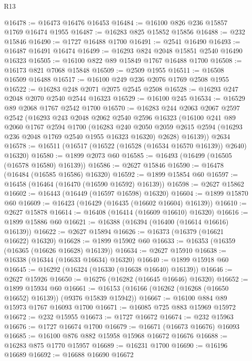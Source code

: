 \begin{lexlean}{R13}
\begin{coremodule}
@16478 := @16473 @16476 @16453
@16484 := @16100 @826 @236 @15857 @1769 @16474 @1955
@16487 := @16283 @825 @15852 @15856
@16488 := @232 @15846
@16490 := @1727 @16488 @1700
@16491 := @2541 @16490
@16493 := @16487 @16491 @16474
@16499 := @16293 @824 @2048 @15851 @2540 @16490 @16323
@16505 := @16100 @822 @89 @15849 @1767 @16488 @1700
@16508 := @16173 @821 @7068 @15848
@16509 := @2509 @1955
@16511 := @16508 @16509 @16488
@16517 := @16100 @249 @236 @2076 @1769 @2508 @1955
@16522 := @16283 @248 @2071 @2075 @2545 @2508
@16528 := @16293 @247 @2048 @2070 @2540 @2544 @16323
@16529 := @16100 @245
@16534 := @16529 @89 @2068 @1767 @2542 @1700
@16570 := @16283
    @244
    @2063
    @2067
    @2597
    @2542
    (@16293
      @243
      @2048
      @2062
      @2540
      @2596
      @16323
      (@16100
        @241
        @89
        @2060
        @1767
        @2594
        @1700
        (@16283
          @240
          @2050
          @2059
          @2615
          @2594
          (@16293 @236 @2048 @1769 @2540 @1955 @16323 @16320)
          @2628)
        @16139))
    @2634
@16578 := @16511 (@16517 (@16522 (@16528 (@16534 @16570 @16139)) @2640) @16320)
@16580 := @1899 @2073 @60
@16585 := @16493 (@16499 (@16505 (@16578 @16580) @16139))
@16586 := @2627 @15846
@16590 := @16478 (@16484 (@16585 @16586) @16320)
@16592 := @1899 @15854 @60
@16597 := @16458 (@16464 (@16470 (@16590 @16592) @16139))
@16598 := @2627 @15862
@16602 := @16443 (@16449 (@16597 @16598) @16320)
@16604 := @1899 @15870 @60
@16609 := @16423 (@16429 (@16435 (@16602 @16604) @16139))
@16610 := @2627 @15878
@16614 := @16408 (@16414 (@16609 @16610) @16320)
@16616 := @1899 @15886 @60
@16621 := @16388 (@16394 (@16400 (@16614 @16616) @16139))
@16622 := @2627 @15894
@16626 := @16373 (@16379 (@16621 @16622) @16320)
@16628 := @1899 @15902 @60
@16633 := @16353 (@16359 (@16365 (@16626 @16628) @16139))
@16634 := @2627 @15910
@16638 := @16338 (@16344 (@16633 @16634) @16320)
@16640 := @1899 @15918 @60
@16645 := @16292 (@16324 (@16330 (@16638 @16640) @16139))
@16646 := @2627 @15926
@16650 := @16276 (@16282 (@16645 @16646) @16320)
@16652 := @1899 @15934 @60
@16661 := @16153 (@16166 (@16262 (@16268 (@16650 @16652) @16139)) (@9376 @15839 @15942))
@16667 := @16100 @884 @89 @15973 @1767 @16093 @1700
@16671 := @16085 @725 @883 @15969 @15972
@16672 := @232 @15955
@16673 := @1727 @16672
@16674 := @232 @15963
@16676 := @1727 @16674 @1700
@16679 := @16671 (@16673 @16676) @16093
@16685 := @16100 @876 @882 @15958 @15968 @16672 @16676
@16688 := @16283 @875 @1770 @15957
@16689 := @16231 @1700
@16690 := @16196 @16689
@16692 := @16688 @16690 @16672

\end{coremodule}
\end{lexlean}
